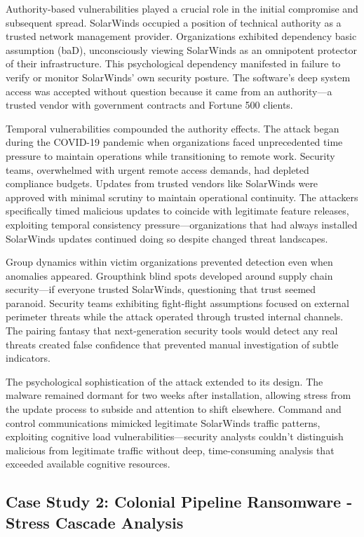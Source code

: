 \documentclass[manuscript,screen,review]{acmart}
\begin{document}
Authority-based vulnerabilities played a crucial role in the initial compromise and subsequent spread. SolarWinds occupied a position of technical authority as a trusted network management provider. Organizations exhibited dependency basic assumption (baD), unconsciously viewing SolarWinds as an omnipotent protector of their infrastructure. This psychological dependency manifested in failure to verify or monitor SolarWinds' own security posture. The software's deep system access was accepted without question because it came from an authority—a trusted vendor with government contracts and Fortune 500 clients.

Temporal vulnerabilities compounded the authority effects. The attack began during the COVID-19 pandemic when organizations faced unprecedented time pressure to maintain operations while transitioning to remote work. Security teams, overwhelmed with urgent remote access demands, had depleted compliance budgets. Updates from trusted vendors like SolarWinds were approved with minimal scrutiny to maintain operational continuity. The attackers specifically timed malicious updates to coincide with legitimate feature releases, exploiting temporal consistency pressure—organizations that had always installed SolarWinds updates continued doing so despite changed threat landscapes.

Group dynamics within victim organizations prevented detection even when anomalies appeared. Groupthink blind spots developed around supply chain security—if everyone trusted SolarWinds, questioning that trust seemed paranoid. Security teams exhibiting fight-flight assumptions focused on external perimeter threats while the attack operated through trusted internal channels. The pairing fantasy that next-generation security tools would detect any real threats created false confidence that prevented manual investigation of subtle indicators.

The psychological sophistication of the attack extended to its design. The malware remained dormant for two weeks after installation, allowing stress from the update process to subside and attention to shift elsewhere. Command and control communications mimicked legitimate SolarWinds traffic patterns, exploiting cognitive load vulnerabilities—security analysts couldn't distinguish malicious from legitimate traffic without deep, time-consuming analysis that exceeded available cognitive resources.

\subsection{Case Study 2: Colonial Pipeline Ransomware - Stress Cascade Analysis}
\end{document}

